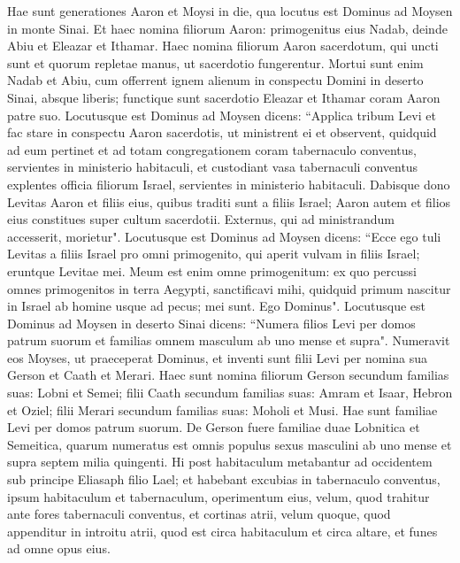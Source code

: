 \begin{biblechapter}  
\verse Hae sunt generationes Aaron et Moysi in die, qua locutus est Dominus ad Moysen in monte Sinai. 
\verse Et haec nomina filiorum Aaron: primogenitus eius Nadab, deinde Abiu et Eleazar et Ithamar. 
\verse Haec nomina filiorum Aaron sacerdotum, qui uncti sunt et quorum repletae manus, ut sacerdotio fungerentur. 
\verse Mortui sunt enim Nadab et Abiu, cum offerrent ignem alienum in conspectu Domini in deserto Sinai, absque liberis; functique sunt sacerdotio Eleazar et Ithamar coram Aaron patre suo. 
\verse Locutusque est Dominus ad Moysen dicens: 
\verse “Applica tribum Levi et fac stare in conspectu Aaron sacerdotis, ut ministrent ei 
\verse et observent, quidquid ad eum pertinet et ad totam congregationem coram tabernaculo conventus, servientes in ministerio habitaculi, 
\verse et custodiant vasa tabernaculi conventus explentes officia filiorum Israel, servientes in ministerio habitaculi. 
\verse Dabisque dono Levitas Aaron et filiis eius, quibus traditi sunt a filiis Israel; 
\verse Aaron autem et filios eius constitues super cultum sacerdotii. Externus, qui ad ministrandum accesserit, morietur". 
\verse Locutusque est Dominus ad Moysen dicens: 
\verse “Ecce ego tuli Levitas a filiis Israel pro omni primogenito, qui aperit vulvam in filiis Israel; eruntque Levitae mei. 
\verse Meum est enim omne primogenitum: ex quo percussi omnes primogenitos in terra Aegypti, sanctificavi mihi, quidquid primum nascitur in Israel ab homine usque ad pecus; mei sunt. Ego Dominus". 
\verse Locutusque est Dominus ad Moysen in deserto Sinai dicens: 
\verse “Numera filios Levi per domos patrum suorum et familias omnem masculum ab uno mense et supra". 
\verse Numeravit eos Moyses, ut praeceperat Dominus, 
\verse et inventi sunt filii Levi per nomina sua Gerson et Caath et Merari. 
\verse Haec sunt nomina filiorum Gerson secundum familias suas: Lobni et Semei; 
\verse filii Caath secundum familias suas: Amram et Isaar, Hebron et Oziel; 
\verse filii Merari secundum familias suas: Moholi et Musi. Hae sunt familiae Levi per domos patrum suorum. 
\verse De Gerson fuere familiae duae Lobnitica et Semeitica, 
\verse quarum numeratus est omnis populus sexus masculini ab uno mense et supra septem milia quingenti.  
\verse Hi post habitaculum metabantur ad occidentem 
\verse sub principe Eliasaph filio Lael; 
\verse et habebant excubias in tabernaculo conventus, ipsum habitaculum et tabernaculum, operimentum eius, velum, quod trahitur ante fores tabernaculi conventus, 
\verse et cortinas atrii, velum quoque, quod appenditur in introitu atrii, quod est circa habitaculum et circa altare, et funes ad omne opus eius. 

\end{biblechapter}
